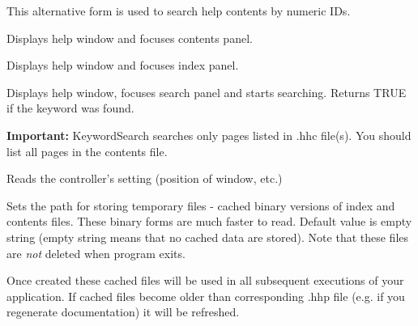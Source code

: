 
This alternative form is used to search help contents by numeric IDs.


\label{wxhtmlhelpcontrollerdisplaycontents}


Displays help window and focuses contents panel.

\label{wxhtmlhelpcontrollerdisplayindex}


Displays help window and focuses index panel.

\label{wxhtmlhelpcontrollerkeywordsearch}


Displays help window, focuses search panel and starts searching.
Returns TRUE if the keyword was found.

{\bf Important:} KeywordSearch searches only pages listed in .hhc file(s).
You should list all pages in the contents file.

\label{wxhtmlhelpcontrollerreadcustomization}


Reads the controller's setting (position of window, etc.)

\label{wxhtmlhelpcontrollersettempdir}


Sets the path for storing temporary files - cached binary versions of index and contents files. These binary
forms are much faster to read. Default value is empty string (empty string means
that no cached data are stored). Note that these files are {\it not} 
deleted when program exits.

Once created these cached files will be used in all subsequent executions 
of your application. If cached files become older than corresponding .hhp
file (e.g. if you regenerate documentation) it will be refreshed.


